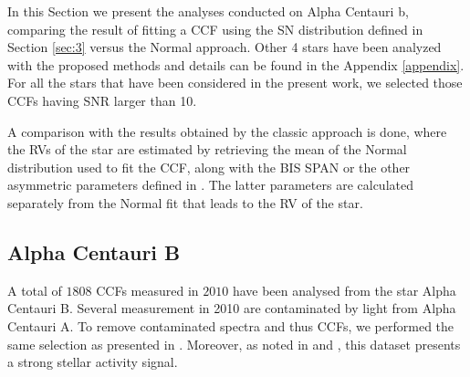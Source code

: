 \documentclass[11pt, oneside]{article}
\begin{document}
In this Section we present the analyses conducted on Alpha Centauri b, comparing the result of fitting a CCF using the SN distribution defined in Section \ref{sec:3} versus the Normal approach. Other 4 stars have been analyzed with the proposed methods and details can be found in the Appendix \ref{appendix}. For all the stars that have been considered in the present work, we selected those CCFs having SNR larger than 10.

 A comparison with the results obtained by the classic approach is done, where the RVs of the star are estimated by retrieving the mean of the Normal distribution used to fit the CCF, along with the BIS SPAN or the other asymmetric parameters defined in \citet{Figueira-2013}. The latter parameters are calculated separately from the Normal fit that leads to the RV of the star.

\subsection{Alpha Centauri B} \label{sec:alphacentb}

A total of $1808$ CCFs measured in $2010$ have been analysed from the star Alpha Centauri B. Several measurement in 2010 are contaminated by light from Alpha Centauri A. To remove contaminated spectra and thus CCFs, we performed the same selection as presented in \citet{Dumusque-2012}. Moreover, as noted in \citet{Dumusque-2012} and \citet{Thompson-2017}, this dataset presents a strong stellar activity signal.
\end{document}
